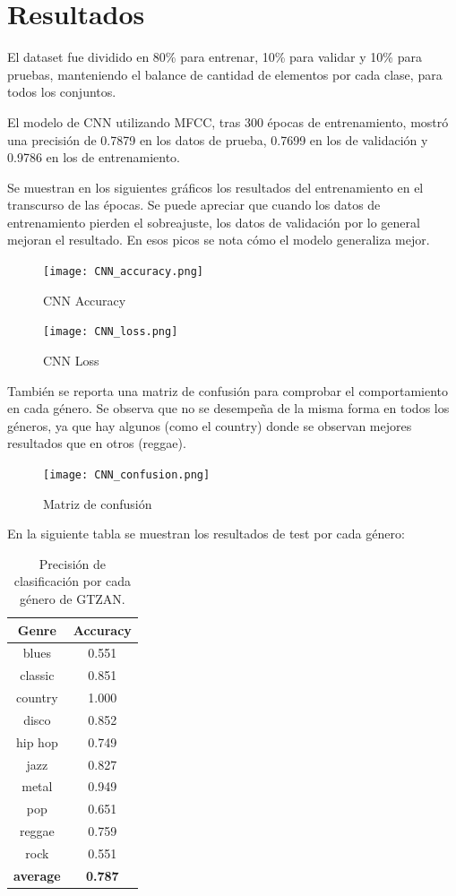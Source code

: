 \documentclass[colorinlistoftodos,twoside,twocolumn,10pt]{article} %
\begin{document}
\section{Resultados}
El dataset fue dividido en 80\% para entrenar, 10\% para validar y 10\% para pruebas, manteniendo el balance de cantidad de elementos por cada clase, para todos los conjuntos.

El modelo de CNN utilizando MFCC, tras 300 \'epocas de entrenamiento, mostr\'o una precisi\'on de 0.7879 en los datos de prueba, 0.7699 en los de validaci\'on y 0.9786 en los de entrenamiento.

Se muestran en los siguientes gr\'aficos los resultados del entrenamiento en el transcurso de las \'epocas. Se puede apreciar que cuando los datos de entrenamiento pierden el sobreajuste, los datos de validaci\'on por lo general mejoran el resultado. En esos picos se nota c\'omo el modelo generaliza mejor.

\begin{figure}[h!] 
	\centering
	\texttt{[image: CNN\_accuracy.png]}
	\caption{CNN Accuracy}
\end{figure}

\begin{figure}[h!] 
	\centering
	\texttt{[image: CNN\_loss.png]}
	\caption{CNN Loss}
\end{figure}

Tambi\'en se reporta una matriz de confusi\'on para comprobar
el comportamiento en cada g\'enero. Se observa que no
se desempe\~na de la misma forma en todos los g\'eneros,
ya que hay algunos (como el country) donde se
observan mejores resultados que en otros (reggae).

\begin{figure}[h!] 
	\centering
	\texttt{[image: CNN\_confusion.png]}
	\caption{Matriz de confusi\'on}
\end{figure}

En la siguiente tabla se muestran los resultados de test por cada g\'enero:
\begin{table}[h]
\centering
\begin{tabular}{|c|c|}
\hline
\textbf{Genre} & \textbf{Accuracy} \\ \hline
blues & 0.551 \\ \hline
classic & 0.851 \\ \hline
country & 1.000 \\ \hline
disco & 0.852 \\ \hline
hip hop & 0.749 \\ \hline
jazz & 0.827 \\ \hline
metal & 0.949 \\ \hline
pop & 0.651 \\ \hline
reggae & 0.759 \\ \hline
rock & 0.551 \\ \hline
\textbf{average} & \textbf{0.787} \\ \hline
\end{tabular}
\caption{Precisi\'on de clasificaci\'on por cada g\'enero de GTZAN.}
\label{tabla:3}
\end{table}
\end{document}
